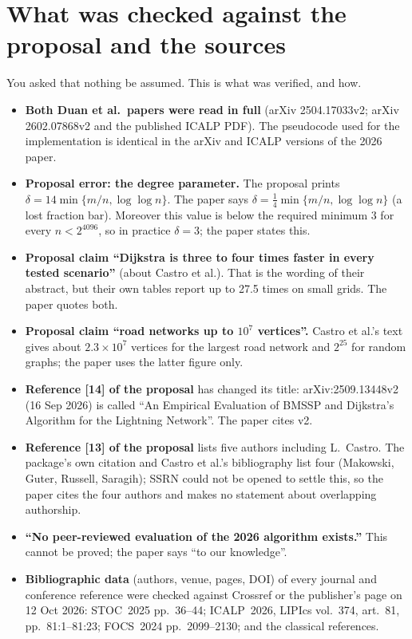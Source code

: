 \documentclass[11pt,a4paper]{article}
\begin{document}
\section{What was checked against the proposal and the sources}\label{sec:verified}
You asked that nothing be assumed. This is what was verified, and how.
\begin{itemize}
\item \textbf{Both Duan et al.\ papers were read in full} (arXiv 2504.17033v2; arXiv 2602.07868v2 and the published ICALP PDF). The pseudocode used for the implementation is identical in the arXiv and ICALP versions of the 2026 paper.
\item \textbf{Proposal error: the degree parameter.} The proposal prints $\delta=14\min\{m/n,\log\log n\}$. The paper says $\delta=\tfrac14\min\{m/n,\log\log n\}$ (a lost fraction bar). Moreover this value is below the required minimum $3$ for every $n<2^{4096}$, so in practice $\delta=3$; the paper states this.
\item \textbf{Proposal claim ``Dijkstra is three to four times faster in every tested scenario''} (about Castro et al.). That is the wording of their abstract, but their own tables report up to 27.5 times on small grids. The paper quotes both.
\item \textbf{Proposal claim ``road networks up to $10^7$ vertices''.} Castro et al.'s text gives about $2.3\times10^7$ vertices for the largest road network and $2^{25}$ for random graphs; the paper uses the latter figure only.
\item \textbf{Reference [14] of the proposal} has changed its title: arXiv:2509.13448v2 (16 Sep 2026) is called ``An Empirical Evaluation of BMSSP and Dijkstra's Algorithm for the Lightning Network''. The paper cites v2.
\item \textbf{Reference [13] of the proposal} lists five authors including L.~Castro. The package's own citation and Castro et al.'s bibliography list four (Makowski, Guter, Russell, Saragih); SSRN could not be opened to settle this, so the paper cites the four authors and makes no statement about overlapping authorship.
\item \textbf{``No peer-reviewed evaluation of the 2026 algorithm exists.''} This cannot be proved; the paper says ``to our knowledge''.
\item \textbf{Bibliographic data} (authors, venue, pages, DOI) of every journal and conference reference were checked against Crossref or the publisher's page on 12 Oct 2026: STOC~2025 pp.~36--44; ICALP~2026, LIPIcs vol.~374, art.~81, pp.~81:1--81:23; FOCS~2024 pp.~2099--2130; and the classical references.

\end{itemize}
\end{document}
